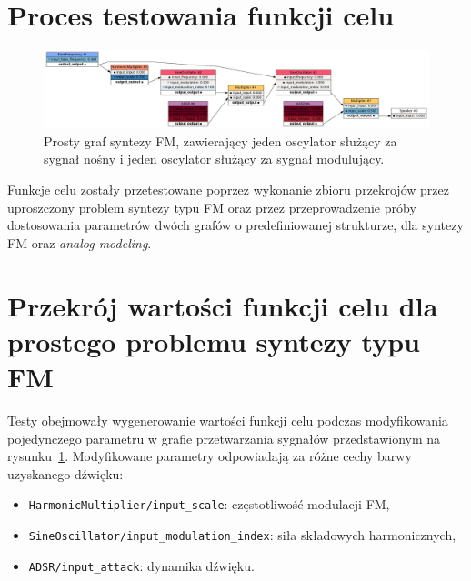 \section{Proces testowania funkcji celu}

\begin{figure}[H]\label{fig:fm_graph_for_benchmarks}
    \centering
    \includegraphics[width=1.0\linewidth]{rys03/fm_graph_for_benchmarks.png}
    \caption{
      Prosty graf syntezy FM, zawierający jeden oscylator służący za sygnał nośny
      i jeden oscylator służący za sygnał modulujący.
    }
\end{figure}

Funkcje celu zostały przetestowane poprzez wykonanie
zbioru przekrojów przez uproszczony problem syntezy typu FM oraz
przez przeprowadzenie próby dostosowania parametrów dwóch grafów
o predefiniowanej strukturze, dla syntezy FM oraz \textit{analog modeling}.

\section{Przekrój wartości funkcji celu dla prostego problemu syntezy typu FM}

Testy obejmowały wygenerowanie wartości funkcji celu podczas
modyfikowania pojedynczego parametru w grafie przetwarzania sygnałów
przedstawionym na rysunku~\ref{fig:fm_graph_for_benchmarks}.
Modyfikowane parametry odpowiadają za różne cechy barwy uzyskanego dźwięku:

\begin{itemize}
  \item \texttt{HarmonicMultiplier/input\_scale}: częstotliwość modulacji FM,
  \item \texttt{SineOscillator/input\_modulation\_index}: siła składowych harmonicznych,
  \item \texttt{ADSR/input\_attack}: dynamika dźwięku.
\end{itemize}



